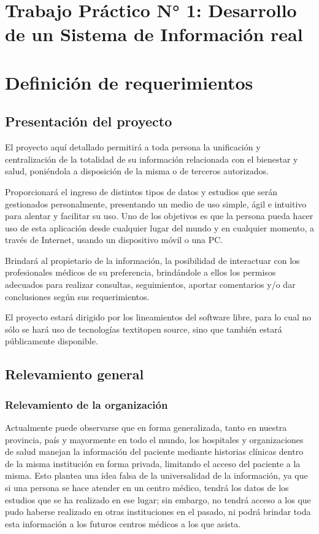 
\section*{Trabajo Práctico N° 1: Desarrollo de un Sistema de Información real}

\section{Definición de requerimientos}

\subsection{Presentación del proyecto}
El proyecto aquí detallado permitirá a toda persona la unificación y centralización de la totalidad de su información relacionada con el bienestar y salud, poniéndola a disposición de la misma o de terceros autorizados.

Proporcionará el ingreso de distintos tipos de datos y estudios que serán gestionados personalmente, presentando un medio de uso simple, ágil e intuitivo para alentar y facilitar su uso.
Uno de los objetivos es que la persona pueda hacer uso de esta aplicación desde cualquier lugar del mundo y en cualquier momento, a través de Internet, usando un dispositivo móvil o una PC.

Brindará al propietario de la información, la posibilidad  de interactuar con los profesionales médicos de su preferencia, brindándole a ellos los permisos adecuados para realizar consultas, seguimientos, aportar comentarios y/o dar conclusiones según sus requerimientos.

El proyecto estará dirigido por los lineamientos del software libre, para lo cual no sólo se hará uso de tecnologías textit{open source}, sino que también estará públicamente disponible.


\subsection{Relevamiento general}

\subsubsection{Relevamiento de la organización}

Actualmente puede observarse que en forma generalizada, tanto en nuestra provincia, país y mayormente en todo el mundo, los hospitales y organizaciones de salud manejan la información del paciente mediante historias clínicas dentro de la misma institución en forma privada, limitando el acceso del paciente a la misma.
Esto plantea una idea falsa de la universalidad de la información, ya que si una persona se hace atender en un centro médico, tendrá los datos de los estudios que se ha realizado en ese lugar; sin embargo, no tendrá acceso a los que pudo haberse realizado en otras instituciones en el pasado, ni podrá brindar toda esta información a los futuros centros médicos a los que asista.

